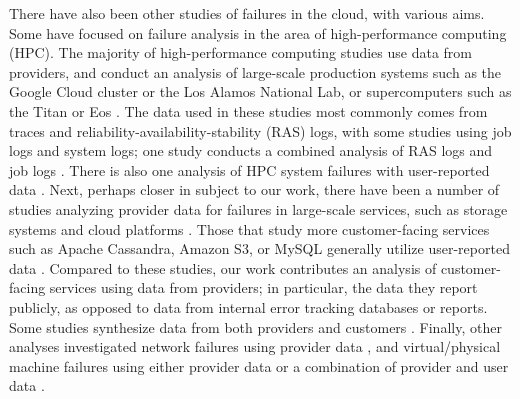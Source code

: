 There have also been other studies of failures in the cloud, with various aims.
Some have focused on failure analysis in the area of high-performance computing (HPC).
The majority of high-performance computing studies use data from providers, and conduct an analysis of large-scale production systems such as the Google Cloud cluster or the Los Alamos National Lab, or supercomputers such as the Titan or Eos \cite{chen2014, elsayed2017, liang2006, zheng2011, kavulya2010, gupta2015, gupta2017, di2019, elsayed2013, martino2014, schroeder2010, javadi2013, schroeder2007}.
The data used in these studies most commonly comes from traces and reliability-availability-stability (RAS) logs, with some studies using job logs and system logs; one study conducts a combined analysis of RAS logs and job logs \cite{zheng2011}.
There is also one analysis of HPC system failures with user-reported data \cite{gray1986}.
Next, perhaps closer in subject to our work, there have been a number of studies analyzing provider data for failures in large-scale services, such as storage systems and cloud platforms \cite{oppenheimer2003, ford2010, schroeder2007, javadi2013, garraghan2014, yalagandula2004, li2013, zhou2015}.
Those that study more customer-facing services such as Apache Cassandra, Amazon S3, or MySQL generally utilize user-reported data \cite{frattini2013, yuan2014, palankar2008, fonseca2010, fonseca2010, benson2010, jiang2008, yin2011}.
Compared to these studies, our work contributes an analysis of customer-facing services using data from providers; in particular, the data they report publicly, as opposed to data from internal error tracking databases or reports.
Some studies synthesize data from both providers and customers \cite{ostermann2008, sahoo2010}.
Finally, other analyses investigated network failures using provider data \cite{gill2011, banerjee2015, turner2010}, and virtual/physical machine failures using either provider data \cite{vishwanath2010, nightingale2011, rosa2015} or a combination of provider and user data \cite{birke2014}.
